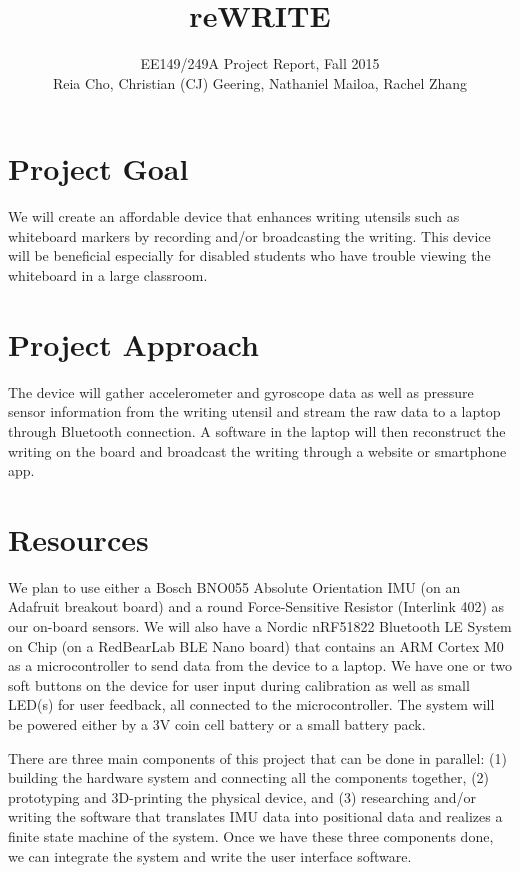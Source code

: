 \documentclass[12pt,journal]{IEEEtran}
\begin{document}
\title{reWRITE}

\author{EE149/249A Project Report, Fall 2015

Reia Cho, Christian (CJ) Geering, Nathaniel Mailoa, Rachel Zhang}


\maketitle

\section{Project Goal}
We will create an affordable device that enhances writing utensils such as whiteboard markers by recording and/or broadcasting the writing. This device will be beneficial especially for disabled students who have trouble viewing the whiteboard in a large classroom.


\section{Project Approach}
The device will gather accelerometer and gyroscope data as well as pressure sensor information from the writing utensil and stream the raw data to a laptop through Bluetooth connection. A software in the laptop will then reconstruct the writing on the board and broadcast the writing through a website or smartphone app.


\section{Resources}
We plan to use either a Bosch BNO055 Absolute Orientation IMU (on an Adafruit breakout board) and a round Force-Sensitive Resistor (Interlink 402) as our on-board sensors. We will also have a Nordic nRF51822 Bluetooth LE System on Chip (on a RedBearLab BLE Nano board) that contains an ARM Cortex M0 as a microcontroller to send data from the device to a laptop. We have one or two soft buttons on the device for user input during calibration as well as small LED(s) for user feedback, all connected to the microcontroller. The system will be powered either by a 3V coin cell battery or a small battery pack.

There are three main components of this project that can be done in parallel: (1) building the hardware system and connecting all the components together, (2) prototyping and 3D-printing the physical device, and (3) researching and/or writing the software that translates IMU data into positional data and realizes a finite state machine of the system. Once we have these three components done, we can integrate the system and write the user interface software.
\end{document}
